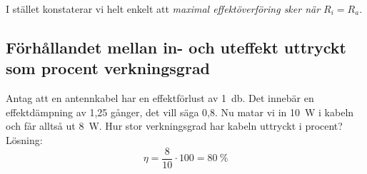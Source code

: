 I stället konstaterar vi helt enkelt att \emph{maximal effektöverföring sker när
\(R_i = R_a\)}.

\subsection{Förhållandet mellan in- och uteffekt uttryckt som procent verkningsgrad}
\label{verkningsgrad}

Antag att en antennkabel har en effektförlust av \SI{1}{\decibel}.
Det innebär en effektdämpning av 1,25 gånger, det vill säga 0,8.
Nu matar vi in \SI{10}{\watt} i kabeln och får alltså ut \SI{8}{\watt}.
Hur stor verkningsgrad har kabeln uttryckt i procent?
Lösning:
\[\eta = \dfrac{8}{10} \cdot 100 = 80\ \%\]
